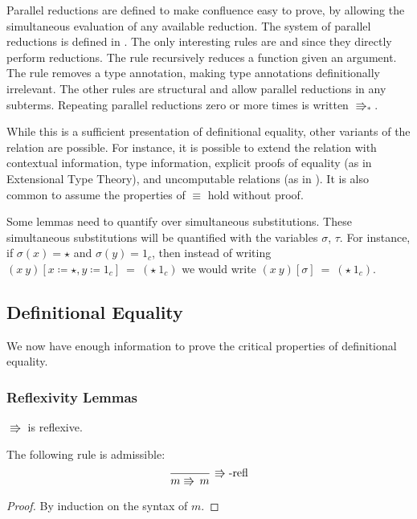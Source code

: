  Parallel reductions are defined to make confluence easy to prove, by allowing the simultaneous evaluation of any available reduction.
The system of parallel reductions is defined in .
The only interesting rules are  and  since they directly perform reductions.
The  rule recursively reduces a function given an argument.
The  rule removes a type annotation, making type annotations definitionally irrelevant.
The other rules are structural and allow parallel reductions in any subterms.
Repeating parallel reductions zero or more times is written $\Rrightarrow_{\ast}$.
 
While this is a sufficient presentation of definitional equality, other variants of the relation are possible.
For instance, it is possible to extend the relation with contextual information, type information, explicit proofs of equality (as in Extensional Type Theory), and uncomputable relations (as in \cite{jia2010dependent}).
It is also common to assume the properties of $\equiv$ hold without proof.
 
Some lemmas need to quantify over simultaneous substitutions.
These simultaneous substitutions will be quantified with the variables $\sigma$, $\tau$.
For instance, if $\sigma(x) = \star$ and $\sigma(y) = 1_c$, then instead of writing $(x\ y)[x \coloneqq \star,y \coloneqq 1_c]\ =\ (\star\ 1_c)$ we would write $(x\ y)[\sigma]\ =\ (\star\ 1_c)$.
 
 
\subsection{Definitional Equality}
 
We now have enough information to prove the critical properties of definitional equality.

 
\subsubsection{Reflexivity Lemmas}
\begin{lem}
$\Rrightarrow$ is reflexive.

The following rule is admissible:
\[
\frac{\,}{m\Rrightarrow\,m}\,\operatorname{\Rrightarrow-refl}
\]
\end{lem}
\begin{proof}
By induction on the syntax of $m$.
\end{proof}


